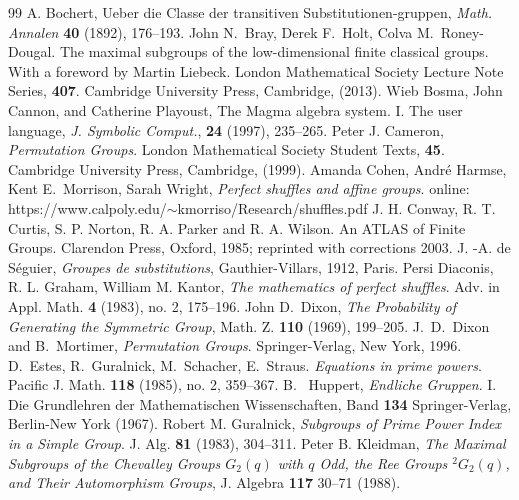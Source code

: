 \documentclass[12pt]{amsart}
\theoremstyle{remark}
\theoremstyle{definition}
\begin{document}
 











\begin{thebibliography}{99}
 A. Bochert, Ueber die Classe der transitiven Substitutionen-gruppen, {\em Math. Annalen} {\bf40} (1892), 176--193.
 John N.~Bray, Derek F.~Holt, Colva M.~Roney-Dougal.
The maximal subgroups of the low-dimensional finite classical groups. 
With a foreword by Martin Liebeck. London Mathematical Society Lecture Note Series, \textbf{407}. Cambridge University Press, Cambridge, (2013).
  Wieb Bosma, John Cannon, and Catherine Playoust, The Magma algebra system. I. The user language, 
{\em J. Symbolic Comput.}, {\bf24} (1997), 235--265.
 Peter J. Cameron, \emph{Permutation Groups}. London Mathematical Society Student Texts, \textbf{45}. Cambridge University Press, Cambridge, (1999).
 Amanda Cohen, Andr\'e Harmse, Kent E.~Morrison, Sarah Wright, \emph{Perfect shuffles and affine groups}. online: https://www.calpoly.edu/{$\sim$}kmorriso/Research/shuffles.pdf
 J. H. Conway, R. T. Curtis, S. P. Norton, R. A. Parker and R. A. Wilson. An ATLAS of Finite Groups. Clarendon Press, Oxford, 1985; reprinted with corrections 2003.
 J. -A. de S\'eguier, {\em Groupes de substitutions}, Gauthier-Villars, 1912, Paris.
 Persi Diaconis,   R. L. Graham, William M.  Kantor, \emph{The mathematics of perfect shuffles}.  Adv. in Appl. Math. \textbf{4} (1983), no. 2, 175--196.
 John D.~Dixon, \emph{The Probability of Generating the Symmetric Group}, Math. Z. \textbf{110} (1969), 199--205.
 J.~D.~Dixon and B.~Mortimer, {\it Permutation Groups}. Springer-Verlag, New York, 1996.
 D.~Estes, R.~Guralnick, M.~Schacher, E.~Straus. \emph{Equations in prime powers}. Pacific J. Math. \textbf{118} (1985), no. 2, 359--367. 
 B.~ Huppert, \emph{Endliche Gruppen}. I. 
Die Grundlehren der Mathematischen Wissenschaften, Band \textbf{134} Springer-Verlag, Berlin-New York (1967).
 Robert M. Guralnick, \emph{Subgroups of Prime Power Index in a Simple Group}. J. Alg. \textbf{81} (1983), 304--311.
 Peter B. Kleidman, \emph{The Maximal Subgroups of the Chevalley Groups {$G_2(q)$} with {$q$} Odd, the Ree Groups {${}^2G_2(q)$}, and Their Automorphism Groups},  J. Algebra \textbf{117} 30--71 (1988).

\end{thebibliography}
\end{document}

